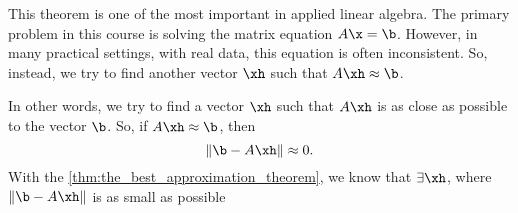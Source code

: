 \begin{multicols}{2}
  \begin{center}
  \end{center}
  \columnbreak\noindent
  This theorem is one of the most important in applied linear algebra. The
  primary problem in this course is solving the matrix equation $A\x = \b$.
  However, in many practical settings, with real data, this equation is often
  inconsistent. So, instead, we try to find another vector $\xh$ such that $A\xh
  \approx \b$.
\end{multicols}

In other words, we try to find a vector $\xh$ such that $A\xh$ is as close as
possible to the vector $\b$. So, if $A\xh \approx \b$, then
\[%
  \lVert \b-A\xh \rVert \approx 0
.\]%
With the \cref{thm:the_best_approximation_theorem}, we know that $\exists \xh$,
where $\lVert \b - A \xh \rVert$ is as small as possible


\newpage

